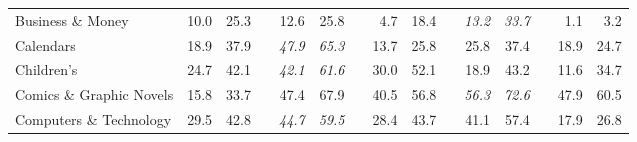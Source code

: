 \documentclass[12pt]{article}
\numberwithin{equation}{section}
\numberwithin{figure}{section}
\begin{document}
\begin{table}[]
{\begin{tabular}{lrrrrrrrrrrrrrr}
	Business \& Money              & 10.0                               & 25.3                               &                               & 12.6                               & 25.8                               &                               & 4.7                                & 18.4                               &                               & \textit{13.2}                      & \textit{33.7}                      &                               & 1.1                                & 3.2                                \\
	Calendars                      & 18.9                               & 37.9                               &                               & \textit{47.9}                      & \textit{65.3}                      &                               & 13.7                               & 25.8                               &                               & 25.8                               & 37.4                               &                               & 18.9                               & 24.7                               \\
	Children’s                     & 24.7                               & 42.1                               &                               & \textit{42.1}                      & \textit{61.6}                      &                               & 30.0                               & 52.1                               &                               & 18.9                               & 43.2                               &                               & 11.6                               & 34.7                               \\
	Comics \& Graphic Novels       & 15.8                               & 33.7                               &                               & 47.4                               & 67.9                               &                               & 40.5                               & 56.8                               &                               & \textit{56.3}                      & \textit{72.6}                      &                               & 47.9                               & 60.5                               \\
	Computers \& Technology        & 29.5                               & 42.8                               &                               & \textit{44.7}                      & \textit{59.5}                      &                               & 28.4                               & 43.7                               &                               & 41.1                               & 57.4                               &                               & 17.9                               & 26.8                               \\

\end{tabular}}
\end{table}
\end{document}

